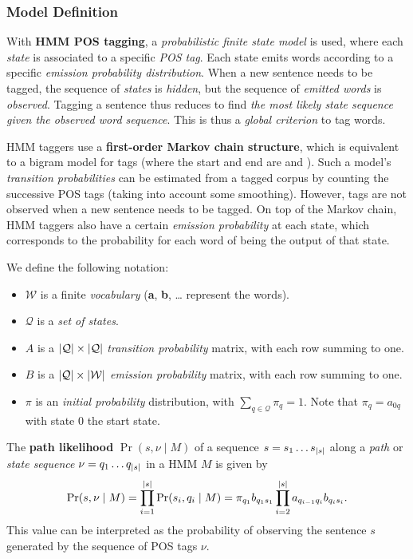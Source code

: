 \subsubsection{Model Definition}
With \textbf{HMM POS tagging}, a \emph{probabilistic finite state model} is used, where each \emph{state} is associated to a specific \emph{POS tag}.
Each state emits words according to a specific \emph{emission probability distribution}.
When a new sentence needs to be tagged, the sequence of \emph{states} is \emph{hidden}, but the sequence of \emph{emitted words} is \emph{observed}.
Tagging a sentence thus reduces to find \emph{the most likely state sequence given the observed word sequence}.
This is thus a \emph{global criterion} to tag words.

HMM taggers use a \textbf{first-order Markov chain structure}, which is equivalent to a bigram model for tags (where the start and end are \stoken{} and \etoken).
Such a model's \emph{transition probabilities} can be estimated from a tagged corpus by counting the successive POS tags (taking into account some smoothing).
However, tags are not observed when a new sentence needs to be tagged.
On top of the Markov chain, HMM taggers also have a certain \emph{emission probability} at each state, which corresponds to the probability for each word of being the output of that state.

We define the following notation:
\begin{itemize}
	\item \(\mathcal{W}\) is a finite \emph{vocabulary} (\textbf{a}, \textbf{b}, \dots{} represent the words).
	\item \(\mathcal{Q}\) is a \emph{set of states}.
	\item \(A\) is a \({\left\lvert\mathcal{Q}\right\lvert} \times {\left\lvert\mathcal{Q}\right\lvert}\) \emph{transition probability} matrix, with each row summing to one.
	\item \(B\) is a \({\left\lvert\mathcal{Q}\right\lvert} \times {\left\lvert\mathcal{W}\right\lvert}\) \emph{emission probability} matrix, with each row summing to one.
	\item \(\pi\) is an \emph{initial probability} distribution, with \(\sum_{q \in \mathcal{Q}} \pi_q = 1\).
	Note that \(\pi_q = a_{0q}\) with state \(0\) the start state.
\end{itemize}

\begin{mydef}
	The \textbf{path likelihood} \(\Pr(s, \nu \mid M)\) of a sequence \(s = s_1\dots s_{{\left\lvert s\right\lvert}}\) along a \emph{path} or \emph{state sequence} \(\nu = q_1 \dots q_{{\left\lvert s\right\lvert}}\) in a HMM \(M\) is given by
	\[
	\Pr(s, \nu \mid M) = \prod_{i=1}^{{\left\lvert s\right\lvert}} \Pr(s_i, q_i \mid M) = \pi_{q_1} b_{q_1 s_1} \prod_{i = 2}^{\left\lvert s\right\lvert} a_{q_{i-1}q_i} b_{q_i s_i}.
	\]
	This value can be interpreted as the probability of observing the sentence \(s\) generated by the sequence of POS tags \(\nu\).
\end{mydef}

